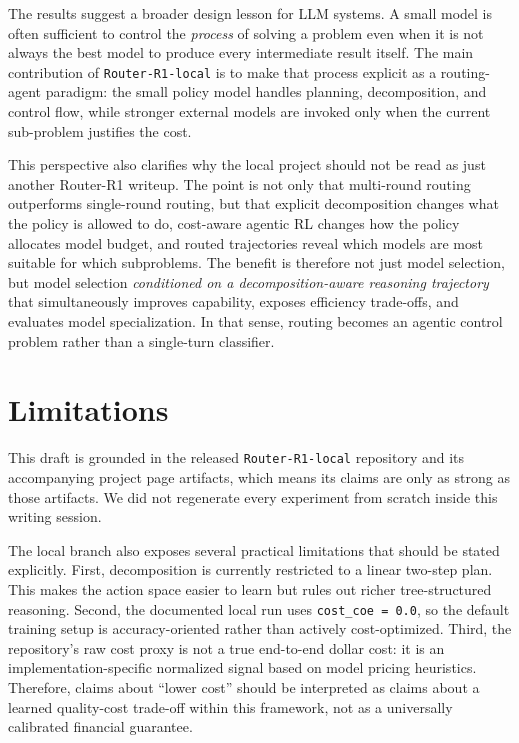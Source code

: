 \documentclass{article}
\begin{document}
The results suggest a broader design lesson for LLM systems. A small model is often sufficient to control the \emph{process} of solving a problem even when it is not always the best model to produce every intermediate result itself. The main contribution of \texttt{Router-R1-local} is to make that process explicit as a routing-agent paradigm: the small policy model handles planning, decomposition, and control flow, while stronger external models are invoked only when the current sub-problem justifies the cost.

This perspective also clarifies why the local project should not be read as just another Router-R1 writeup. The point is not only that multi-round routing outperforms single-round routing, but that explicit decomposition changes what the policy is allowed to do, cost-aware agentic RL changes how the policy allocates model budget, and routed trajectories reveal which models are most suitable for which subproblems. The benefit is therefore not just model selection, but model selection \emph{conditioned on a decomposition-aware reasoning trajectory} that simultaneously improves capability, exposes efficiency trade-offs, and evaluates model specialization. In that sense, routing becomes an agentic control problem rather than a single-turn classifier.

\section{Limitations}
\label{sec:limitations}

This draft is grounded in the released \texttt{Router-R1-local} repository and its accompanying project page artifacts, which means its claims are only as strong as those artifacts. We did not regenerate every experiment from scratch inside this writing session.

The local branch also exposes several practical limitations that should be stated explicitly. First, decomposition is currently restricted to a linear two-step plan. This makes the action space easier to learn but rules out richer tree-structured reasoning. Second, the documented local run uses \texttt{cost\_coe = 0.0}, so the default training setup is accuracy-oriented rather than actively cost-optimized. Third, the repository's raw cost proxy is not a true end-to-end dollar cost: it is an implementation-specific normalized signal based on model pricing heuristics. Therefore, claims about ``lower cost'' should be interpreted as claims about a learned quality-cost trade-off within this framework, not as a universally calibrated financial guarantee.
\end{document}
